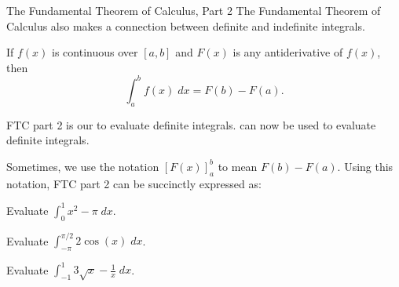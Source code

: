 \documentclass[../main.tex]{subfiles}
\begin{document}
\begin{lesson}{The Fundamental Theorem of Calculus, Part 2}
  The Fundamental Theorem of Calculus also makes a connection between definite and indefinite integrals.

  \begin{mdframed}[style=withref-compact]
    If \(f(x)\) is continuous over \([a,b]\) and \(F(x)\) is any antiderivative of \(f(x)\), then 
    \[
      \int_{a}^{b} f(x) \;dx = F(b) - F(a).
    \]

  \end{mdframed}

  FTC part 2 is our  to evaluate definite integrals.  can now be used to evaluate definite integrals.

  Sometimes, we use the notation \([F(x)]_{a}^{b}\) to mean \(F(b) - F(a)\). Using this notation, FTC part 2 can be succinctly expressed as:

  \begin{example}
    Evaluate \(\int_{0}^{1} x^{2} - \pi \;dx\).
  \end{example}
  \clearpage

  \begin{example}
    Evaluate \(\int_{-\pi}^{\pi/2} 2\cos(x) \;dx\).
  \end{example}

  \begin{example}
    Evaluate \(\int_{-1}^{1} 3 \sqrt{x} - \frac{1}{x} \;dx\).
  \end{example}
\end{lesson}
\end{document}
